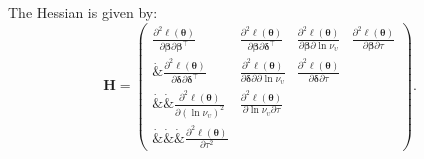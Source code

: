 The Hessian is given by:
\begin{equation*}
\mathbf H= \begin{pmatrix}
         \frac{\partial^2 \ell(\boldsymbol \theta)}{\partial \boldsymbol \beta\partial \boldsymbol \beta^\top} & \frac{\partial^2 \ell(\boldsymbol \theta)}{\partial \boldsymbol \beta\partial \boldsymbol \delta^\top} & \frac{\partial^2 \ell(\boldsymbol \theta)}{\partial \boldsymbol \beta\partial \ln \nu_{\upsilon}} & \frac{\partial^2 \ell(\boldsymbol \theta)}{\partial \boldsymbol \beta\partial \tau} \\
         \dot &  \frac{\partial^2 \ell(\boldsymbol \theta)}{\partial \boldsymbol \delta\partial \boldsymbol \delta^\top} &   \frac{\partial^2 \ell(\boldsymbol \theta)}{\partial \boldsymbol \delta\partial \partial \ln \nu_{\upsilon}} & \frac{\partial^2 \ell(\boldsymbol \theta)}{\partial \boldsymbol \delta\partial \tau} \\
         \dot & \dot & \frac{\partial^2 \ell(\boldsymbol \theta)}{\partial (\ln \nu_{\upsilon})^2} & \frac{\partial^2 \ell(\boldsymbol \theta)}{\partial \ln \nu_{\upsilon} \partial \tau} \\
         \dot & \dot & \dot & \frac{\partial^2 \ell(\boldsymbol \theta)}{\partial \tau^2}
      \end{pmatrix}.
\end{equation*}

